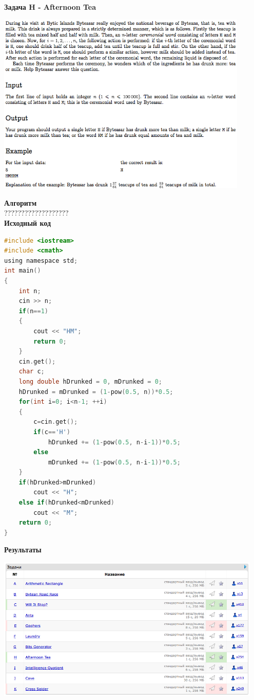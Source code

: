 \documentclass[a4paper,12pt]{article}
\begin{document}
\newpage
\textbf{{\large Задача H - Afternoon Tea}} \\
\begin{center}
\includegraphics[width=0.9\textwidth]{CT_S02E07/CT_S02E07_H.png}\\ [1cm]
\end{center}
\textbf{{\large Алгоритм}} \\
{\Huge ???????????????????} \\ 

\textbf{{\large Исходный код}}
\begin{lstlisting}[language=C]
#include <iostream>
#include <cmath>
using namespace std;
int main()
{
    int n;
    cin >> n;
    if(n==1)
    {
        cout << "HM";
        return 0;
    }
    cin.get();
    char c;
    long double hDrunked = 0, mDrunked = 0;
    hDrunked = mDrunked = (1-pow(0.5, n))*0.5;
    for(int i=0; i<n-1; ++i)
    {
        c=cin.get();
        if(c=='H')
            hDrunked += (1-pow(0.5, n-i-1))*0.5;
        else
            mDrunked += (1-pow(0.5, n-i-1))*0.5;
    }
    if(hDrunked>mDrunked)
        cout << "H";
    else if(hDrunked<mDrunked)
        cout << "M";
    return 0;
}
\end{lstlisting}

\textbf{{\large Результаты}} \\
\begin{center}
\includegraphics[width=0.95\textwidth]{CT_S02E07/CT_S02E07_result.png}\\ [1cm]
\end{center}
\end{document}
